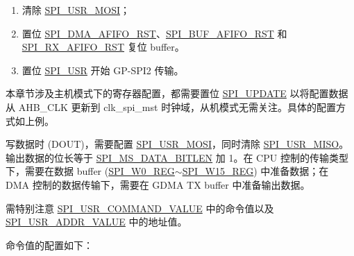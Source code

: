 \documentclass[main\_\_CN.tex]{subfiles}
\begin{document}
\begin{enumerate}
    \item 清除 \hyperref[fielddesc:SPIUSRMOSI]{SPI\_USR\_MOSI}；
    \item 置位 \hyperref[fielddesc:SPIDMAAFIFORST]{SPI\_DMA\_AFIFO\_RST}、\hyperref[fielddesc:SPIBUFAFIFORST]{SPI\_BUF\_AFIFO\_RST} 和 \hyperref[fielddesc:SPIRXAFIFORST]{SPI\_RX\_AFIFO\_RST} 复位 buffer。

    \item 置位 \hyperref[fielddesc:SPIUSR]{SPI\_USR} 开始 GP-SPI2 传输。
\end{enumerate}

\begin{tiplisting}
本章节涉及主机模式下的寄存器配置，都需要置位 \hyperref[fielddesc:SPIUPDATE]{SPI\_UPDATE} 以将配置数据从 AHB\_CLK 更新到 clk\_spi\_mst 时钟域，从机模式无需关注。具体的配置方式如上例。
\end{tiplisting}

写数据时 (DOUT)，需要配置 \hyperref[fielddesc:SPIUSRMOSI]{SPI\_USR\_MOSI}，同时清除 \hyperref[fielddesc:SPIUSRMISO]{SPI\_USR\_MISO}。输出数据的位长等于 \hyperref[fielddesc:SPIMSDATABITLEN]{SPI\_MS\_DATA\_BITLEN} 加 1。在 CPU 控制的传输类型下，需要在数据 buffer (\hyperref[regdesc:SPIW0REG]{SPI\_W0\_REG}$\sim$\hyperref[regdesc:SPIW15REG]{SPI\_W15\_REG}) 中准备数据；在 DMA 控制的数据传输下，需要在 GDMA TX buffer 中准备输出数据。

需特别注意 \hyperref[fielddesc:SPIUSRCOMMANDVALUE]{SPI\_USR\_COMMAND\_VALUE} 中的命令值以及 \hyperref[fielddesc:SPIUSRADDRVALUE]{SPI\_USR\_ADDR\_VALUE} 中的地址值。

命令值的配置如下：
\end{document}
